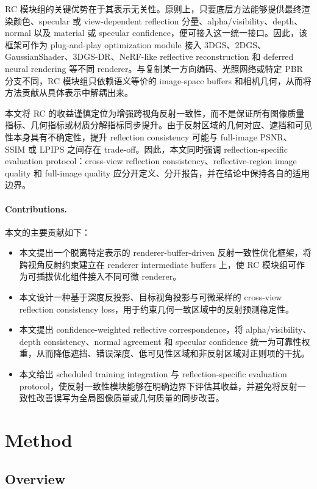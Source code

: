 \documentclass[UTF8,a4paper,11pt]{ctexart}
\begin{document}
RC 模块组的关键优势在于其表示无关性。原则上，只要底层方法能够提供最终渲染颜色、specular 或 view-dependent reflection 分量、alpha/visibility、depth、normal 以及 material 或 specular confidence，便可接入这一统一接口。因此，该框架可作为 plug-and-play optimization module 接入 3DGS、2DGS、GaussianShader、3DGS-DR、NeRF-like reflective reconstruction 和 deferred neural rendering 等不同 renderer。与复制某一方向编码、光照网络或特定 PBR 分支不同，RC 模块组只依赖语义等价的 image-space buffers 和相机几何，从而将方法贡献从具体表示中解耦出来。

本文将 RC 的收益谨慎定位为增强跨视角反射一致性，而不是保证所有图像质量指标、几何指标或材质分解指标同步提升。由于反射区域的几何对应、遮挡和可见性本身具有不确定性，提升 reflection consistency 可能与 full-image PSNR、SSIM 或 LPIPS 之间存在 trade-off。因此，本文同时强调 reflection-specific evaluation protocol：cross-view reflection consistency、reflective-region image quality 和 full-image quality 应分开定义、分开报告，并在结论中保持各自的适用边界。

\paragraph{Contributions.}
本文的主要贡献如下：
\begin{itemize}
    \item 本文提出一个脱离特定表示的 renderer-buffer-driven 反射一致性优化框架，将跨视角反射约束建立在 renderer intermediate buffers 上，使 RC 模块组可作为可插拔优化组件接入不同可微 renderer。
    \item 本文设计一种基于深度反投影、目标视角投影与可微采样的 cross-view reflection consistency loss，用于约束几何一致区域中的反射预测稳定性。
    \item 本文提出 confidence-weighted reflective correspondence，将 alpha/visibility、depth consistency、normal agreement 和 specular confidence 统一为可靠性权重，从而降低遮挡、错误深度、低可见性区域和非反射区域对正则项的干扰。
    \item 本文给出 scheduled training integration 与 reflection-specific evaluation protocol，使反射一致性模块能够在明确边界下评估其收益，并避免将反射一致性改善误写为全局图像质量或几何质量的同步改善。
\end{itemize}

\section{Method}

\subsection{Overview}
\end{document}
